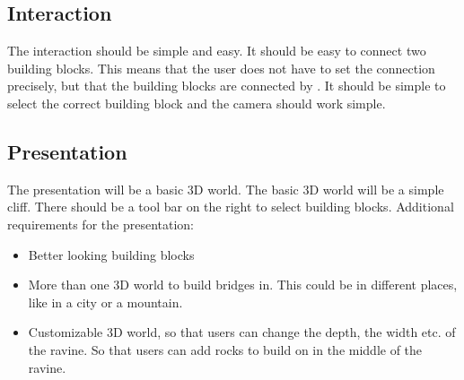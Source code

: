\subsection{Interaction}
The interaction should be simple and easy. It should be easy to connect two building blocks. This means that the user does not have to set the connection precisely, but that the building blocks are connected by \name. It should be simple to select the correct building block and the camera should work simple.


\subsection{Presentation}
The presentation will be a basic 3D world. The basic 3D world will be a simple cliff. There should be a tool bar on the right to select building blocks.
Additional requirements for the presentation:
 \begin{itemize}
 \item Better looking building blocks
 \item More than one 3D world to build bridges in.  This could be in different places, like in a city or a mountain.
 \item Customizable 3D world, so that users can change the depth, the width etc. of the ravine. So that users can add rocks to build on in the middle of the ravine.
 \end{itemize}